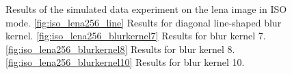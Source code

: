 \documentclass[12pt,notitlepage]{report}
\begin{document}
\begin{figure}[htb]
  \centering

  \caption[Results for the lena image in ISO mode]{Results of the simulated data experiment on the lena image in ISO mode. \ref{fig:iso_lena256_line} Results for diagonal line-shaped blur kernel. \ref{fig:iso_lena256_blurkernel7} Results for blur kernel 7. \ref{fig:iso_lena256_blurkernel8} Results for blur kernel 8. \ref{fig:iso_lena256_blurkernel10} Results for blur kernel 10.}
  \label{fig:iso_lena256}
\end{figure}
\end{document}
